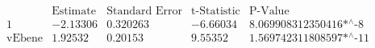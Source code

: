 \[\begin{array}{l|llll}
 \text{} & \text{Estimate} & \text{Standard Error} & \text{t-Statistic} & \text{P-Value} \\
\hline
 1 & -2.13306 & 0.320263 & -6.66034 & \text{8.069908312350416$\grave{ }$*${}^{\wedge}$-8} \\
 \text{vEbene} & 1.92532 & 0.20153 & 9.55352 & \text{1.569742311808597$\grave{ }$*${}^{\wedge}$-11} \\
\end{array}\]

